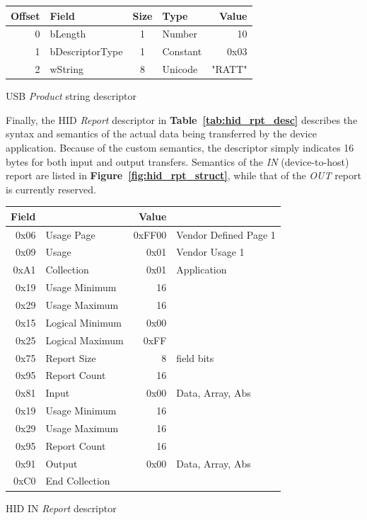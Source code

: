 \documentclass[a4paper,10pt]{article}
\makeatletter
\newenvironment{tablehere}{\def\@captype{table}\vspace{2ex}}{\vspace{2ex}}
\newcommand{\citef}[1]{\textbf{Figure~\ref{#1}}}
\newcommand{\citet}[1]{\textbf{Table~\ref{#1}}}
\makeatother
\begin{document}
\begin{multicols}{2}
\newpage	%
\begin{tablehere}
\centering \footnotesize
\begin{tabular}{|r|l|c|l|r|}
\hline
\textbf{Offset} & \textbf{Field} & \textbf{Size} & \textbf{Type} & \textbf{Value}	\\
\hline
0	& bLength				& 1	& Number	& 10			\\
1	& bDescriptorType		& 1	& Constant	& 0x03			\\
2	& wString				& 8	& Unicode	& "RATT"		\\
\hline
\end{tabular}
\caption{USB \emph{Product} string descriptor}
\label{tab:usb_prod_desc}
\end{tablehere}

Finally, the HID \emph{Report} descriptor in \citet{tab:hid_rpt_desc}
describes the syntax and semantics of the actual data being transferred by the
device application. Because of the custom semantics, the descriptor simply
indicates 16 bytes for both input and output transfers. Semantics of the
\emph{IN} (device-to-host) report are listed in \citef{fig:hid_rpt_struct},
while that of the \emph{OUT} report is currently reserved.

\begin{tablehere}
\centering \footnotesize
\begin{tabular}{|rl|rl|}
\hline
\textbf{Field} & & \textbf{Value} &		\\
\hline
0x06	& Usage Page		& 0xFF00	& Vendor Defined Page 1		\\
0x09	& Usage				& 0x01		& Vendor Usage 1			\\
0xA1	& Collection		& 0x01		& Application				\\
\hline
0x19	& Usage Minimum		& 16		& 							\\
0x29	& Usage Maximum		& 16		&							\\
0x15	& Logical Minimum	& 0x00		&							\\
0x25	& Logical Maximum	& 0xFF		&							\\
0x75	& Report Size		& 8			& field bits				\\
0x95	& Report Count		& 16		& 							\\
0x81	& Input				& 0x00		& Data, Array, Abs			\\
0x19	& Usage Minimum		& 16		& 							\\
0x29	& Usage Maximum		& 16		&							\\
0x95	& Report Count		& 16		& 							\\
0x91	& Output			& 0x00		& Data, Array, Abs			\\
\hline
0xC0	& End Collection	&			&							\\
\hline
\end{tabular}
\caption{HID IN \emph{Report} descriptor}
\label{tab:hid_rpt_desc}
\end{tablehere}


\end{multicols}
\end{document}
